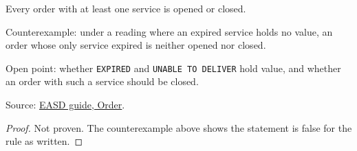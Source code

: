 \begin{theorem}
  \label{thm:one-order-has-status}
  Every order with at least one service is opened or closed.

  Counterexample: under a reading where an expired service holds no value, an
  order whose only service expired is neither opened nor closed.

  Open point: whether \texttt{EXPIRED} and \texttt{UNABLE TO DELIVER} hold
  value, and whether an order with such a service should be closed.

  Source: \href{https://standards.atlassian.net/wiki/spaces/EASD/pages/574849062/Order}{EASD guide, Order}.
\end{theorem}
\begin{proof}
  Not proven.  The counterexample above shows the statement is false for the
  rule as written.
\end{proof}
